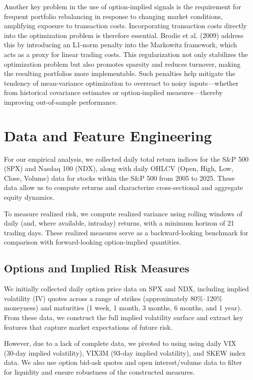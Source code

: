 \documentclass[12pt]{article}
\begin{document}
Another key problem in the use of option-implied signals is the requirement for frequent portfolio rebalancing in response to changing market conditions, amplifying exposure to transaction costs. Incorporating transaction costs directly into the optimization problem is therefore essential. Brodie et al. (2009) address this by introducing an L1-norm penalty into the Markowitz framework, which acts as a proxy for linear trading costs. This regularization not only stabilizes the optimization problem but also promotes sparsity and reduces turnover, making the resulting portfolios more implementable. Such penalties help mitigate the tendency of mean-variance optimization to overreact to noisy inputs—whether from historical covariance estimates or option-implied measures—thereby improving out-of-sample performance.

\newpage
\section{Data and Feature Engineering}


For our empirical analysis, we collected daily total return indices for the S\&P 500 (SPX) and Nasdaq 100 (NDX), along with daily OHLCV (Open, High, Low, Close, Volume) data for stocks within the S\&P 500 from 2005 to 2025. These data allow us to compute returns and characterize cross-sectional and aggregate equity dynamics. 

To measure realized risk, we compute realized variance using rolling windows of daily (and, where available, intraday) returns, with a minimum horizon of 21 trading days. These realized measures serve as a backward-looking benchmark for comparison with forward-looking option-implied quantities.

\subsection{Options and Implied Risk Measures}

We initially collected daily option price data on SPX and NDX, including implied volatility (IV) quotes across a range of strikes (approximately 80\%--120\% moneyness) and maturities (1 week, 1 month, 3 months, 6 months, and 1 year). From these data, we construct the full implied volatility surface and extract key features that capture market expectations of future risk. 

However, due to a lack of complete data, we pivoted to using using daily VIX (30-day implied volatility), VIX3M (93-day implied volatility), and SKEW index data. We also use option bid-ask quotes and open interest/volume data to filter for liquidity and ensure robustness of the constructed measures.
\end{document}
